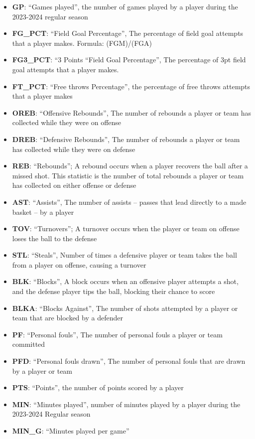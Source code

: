 \documentclass[
]{article}
\providecommand{\tightlist}{%
  \setlength{\itemsep}{0pt}\setlength{\parskip}{0pt}}
\begin{document}
\begin{itemize}
\tightlist
\item
  \textbf{GP}: ``Games played'', the number of games played by a player
  during the 2023-2024 regular season
\item
  \textbf{FG\_PCT}: ``Field Goal Percentage'', The percentage of field
  goal attempts that a player makes. Formula: (FGM)/(FGA)
\item
  \textbf{FG3\_PCT}: ``3 Points ``Field Goal Percentage'', The
  percentage of 3pt field goal attempts that a player makes.
\item
  \textbf{FT\_PCT}: ``Free throws Percentage'', the percentage of free
  throws attempts that a player makes
\item
  \textbf{OREB}: ``Offensive Rebounds'', The number of rebounds a player
  or team has collected while they were on offense
\item
  \textbf{DREB}: ``Defensive Rebounds'', The number of rebounds a player
  or team has collected while they were on defense
\item
  \textbf{REB}: ``Rebounds''; A rebound occurs when a player recovers
  the ball after a missed shot. This statistic is the number of total
  rebounds a player or team has collected on either offense or defense
\item
  \textbf{AST}: ``Assists'', The number of assists -- passes that lead
  directly to a made basket -- by a player
\item
  \textbf{TOV}: ``Turnovers''; A turnover occurs when the player or team
  on offense loses the ball to the defense
\item
  \textbf{STL}: ``Steals'', Number of times a defensive player or team
  takes the ball from a player on offense, causing a turnover
\item
  \textbf{BLK}: ``Blocks'', A block occurs when an offensive player
  attempts a shot, and the defense player tips the ball, blocking their
  chance to score
\item
  \textbf{BLKA}: ``Blocks Against'', The number of shots attempted by a
  player or team that are blocked by a defender
\item
  \textbf{PF}: ``Personal fouls'', The number of personal fouls a player
  or team committed
\item
  \textbf{PFD}: ``Personal fouls drawn'', The number of personal fouls
  that are drawn by a player or team
\item
  \textbf{PTS}: ``Points'', the number of points scored by a player
\item
  \textbf{MIN}: ``Minutes played'', number of minutes played by a player
  during the 2023-2024 Regular season
\item
  \textbf{MIN\_G}: ``Minutes played per game''
\end{itemize}
\end{document}
